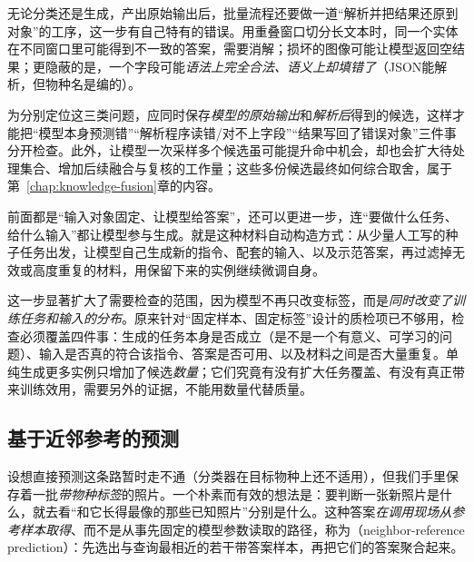 无论分类还是生成，产出原始输出后，批量流程还要做一道“解析并把结果还原到对象”的工序，这一步有自己特有的错误。用重叠窗口切分长文本时，同一个实体在不同窗口里可能得到不一致的答案，需要消解；损坏的图像可能让模型返回空结果；更隐蔽的是，一个字段可能\emph{语法上完全合法、语义上却填错了}（JSON能解析，但物种名是编的）。

为分别定位这三类问题，应同时保存\emph{模型的原始输出}和\emph{解析后}得到的候选，这样才能把“模型本身预测错”“解析程序读错/对不上字段”“结果写回了错误对象”三件事分开检查。此外，让模型一次采样多个候选虽可能提升命中机会，却也会扩大待处理集合、增加后续融合与复核的工作量；这些多份候选最终如何综合取舍，属于第~\ref{chap:knowledge-fusion}章的内容。

前面都是“输入对象固定、让模型给答案”，还可以更进一步，连“要做什么任务、给什么输入”都让模型参与生成。就是这种材料自动构造方式：从少量人工写的种子任务出发，让模型自己生成新的指令、配套的输入、以及示范答案，再过滤掉无效或高度重复的材料，用保留下来的实例继续微调自身。

这一步显著扩大了需要检查的范围，因为模型不再只改变标签，而是\emph{同时改变了训练任务和输入的分布}。原来针对“固定样本、固定标签”设计的质检项已不够用，检查必须覆盖四件事：生成的任务本身是否成立（是不是一个有意义、可学习的问题）、输入是否真的符合该指令、答案是否可用、以及材料之间是否大量重复。单纯生成更多实例只增加了候选\emph{数量}；它们究竟有没有扩大任务覆盖、有没有真正带来训练效用，需要另外的证据，不能用数量代替质量。

\subsection{基于近邻参考的预测}
\label{sec:knowledge-acquisition-neighbor-prediction}

设想直接预测这条路暂时走不通（分类器在目标物种上还不适用），但我们手里保存着一批\emph{带物种标签}的照片。一个朴素而有效的想法是：要判断一张新照片是什么，就去看“和它长得最像的那些已知照片”分别是什么。这种答案\emph{在调用现场从参考样本取得}、而不是从事先固定的模型参数读取的路径，称为（neighbor-reference prediction）：先选出与查询最相近的若干带答案样本，再把它们的答案聚合起来。

